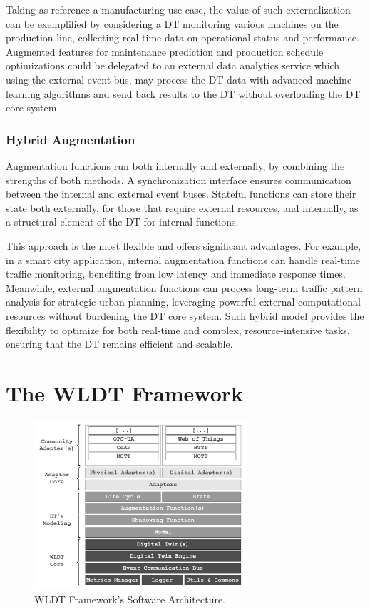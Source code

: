 Taking as reference a manufacturing use case, the value of such externalization can be exemplified by considering a \ac{DT} monitoring various machines on the production line, collecting real-time data on operational status and performance.
Augmented features for maintenance prediction and production schedule optimizations could be delegated to an external data analytics service which, using the external event bus, may process the \ac{DT} data with advanced machine learning algorithms and send back results to the \ac{DT} without overloading the \ac{DT} core system.

\subsubsection{Hybrid Augmentation}
Augmentation functions run both internally and externally, by combining the strengths of both methods.
A synchronization interface ensures communication between the internal and external event buses.
%
Stateful functions can store their state both externally, for those that require external resources, and internally, as a structural element of the \ac{DT} for internal functions.

This approach is the most flexible and offers significant advantages.
For example, in a smart city application, internal augmentation functions can handle real-time traffic monitoring, benefiting from low latency and immediate response times.
Meanwhile, external augmentation functions can process long-term traffic pattern analysis for strategic urban planning, leveraging powerful external computational resources without burdening the \ac{DT} core system.
%
Such hybrid model provides the flexibility to optimize for both real-time and complex, resource-intensive tasks, ensuring that the \ac{DT} remains efficient and scalable.

\section{The \acl{WLDT} Framework}
\label{sec:dte:engineering-dt:wldt-framework}

\begin{figure}
    \centering
    \includegraphics[width=0.7\textwidth]{figures/wldt_architecture.pdf}
    \caption{WLDT Framework's Software Architecture.}
    \label{fig:wldt_architecture}
\end{figure}

